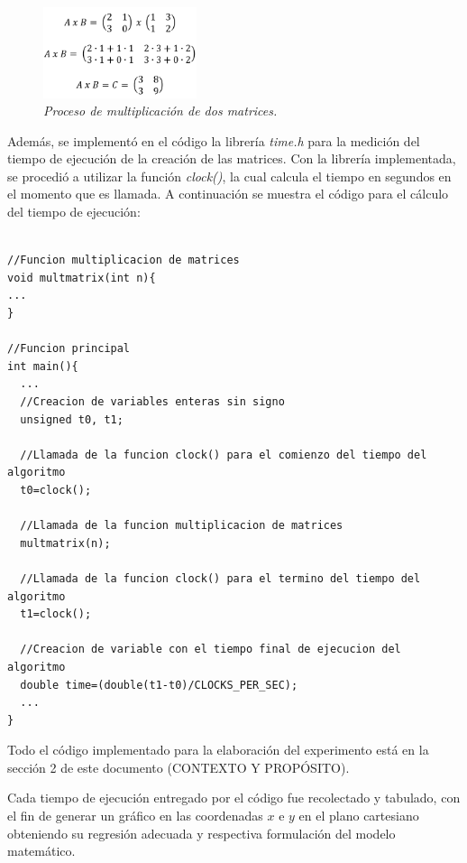 \documentclass[11pt, twocolumn]{llncs}
\begin{document}
\begin{figure}
\caption{\textit{\label{fig:multiplicacion}Proceso de multiplicación de dos matrices.}}
\centering
\includegraphics[width=0.4\textwidth]{multiplicacion.png}
\end{figure}

Además, se implementó en el código la librería \textit{time.h} para la medición del tiempo de ejecución de la creación de las matrices. Con la librería implementada, se procedió a utilizar la función \textit{clock()}, la cual calcula el tiempo en segundos en el momento que es llamada. A continuación se muestra el código para el cálculo del tiempo de ejecución:



\lstset{language=, breaklines=true, basicstyle=\footnotesize}
\begin{lstlisting}[frame=single]

//Funcion multiplicacion de matrices
void multmatrix(int n){
...
}

//Funcion principal
int main(){
  ...
  //Creacion de variables enteras sin signo
  unsigned t0, t1;
  
  //Llamada de la funcion clock() para el comienzo del tiempo del algoritmo
  t0=clock();
  
  //Llamada de la funcion multiplicacion de matrices
  multmatrix(n);
  
  //Llamada de la funcion clock() para el termino del tiempo del algoritmo
  t1=clock();
  
  //Creacion de variable con el tiempo final de ejecucion del algoritmo
  double time=(double(t1-t0)/CLOCKS_PER_SEC);
  ...
}

\end{lstlisting}

Todo el código implementado para la elaboración del experimento está en la sección 2 de este documento (CONTEXTO Y PROPÓSITO).

Cada tiempo de ejecución entregado por el código fue recolectado y tabulado, con el fin de generar un gráfico en las coordenadas $x$ e $y$ en el plano cartesiano obteniendo su regresión adecuada y respectiva formulación del modelo matemático.
\end{document}
